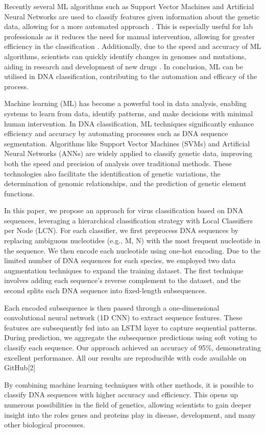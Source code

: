 Recently several ML algorithms such as Support Vector Machines and Artificial Neural Networks are used to classify features given information about the genetic data, allowing for a more automated approach \cite{kalender2020}. This is especially useful for lab professionals as it reduces the need for manual intervention, allowing for greater efficiency in the classification \cite{vihar2019}. Additionally, due to the speed and accuracy of ML algorithms, scientists can quickly identify changes in genomes and mutations, aiding in research and development of new drugs \cite{neto2021}. In conclusion, ML can be utilised in DNA classification, contributing to the automation and efficacy of the process.

Machine learning (ML) has become a powerful tool in data analysis, enabling systems to learn from data, identify patterns, and make decisions with minimal human intervention. In DNA classification, ML techniques significantly enhance efficiency and accuracy by automating processes such as DNA sequence segmentation. Algorithms like Support Vector Machines (SVMs) and Artificial Neural Networks (ANNs) are widely applied to classify genetic data, improving both the speed and precision of analysis over traditional methods. These technologies also facilitate the identification of genetic variations, the determination of genomic relationships, and the prediction of genetic element functions.

In this paper, we propose an approach for virus classification based on DNA sequences, leveraging a hierarchical classification strategy with Local Classifiers per Node (LCN). For each classifier, we first preprocess DNA sequences by replacing ambiguous nucleotides (e.g., M, N) with the most frequent nucleotide in the sequence. We then encode each nucleotide using one-hot encoding. Due to the limited number of DNA sequences for each species, we employed two data augmentation techniques to expand the training dataset. The first technique involves adding each sequence's reverse complement to the dataset, and the second splits each DNA sequence into fixed-length subsequences.

Each encoded subsequence is then passed through a one-dimensional convolutional neural network (1D CNN) to extract sequence features. These features are subsequently fed into an LSTM layer to capture sequential patterns. During prediction, we aggregate the subsequence predictions using soft voting to classify each sequence. Our approach achieved an accuracy of 95\%, demonstrating excellent performance. All our results are reproducible with code available on GitHub[2]


By combining machine learning techniques with other methods, it is possible to classify DNA sequences with higher accuracy and efficiency. This opens up numerous possibilities in the field of genetics, allowing scientists to gain deeper insight into the roles genes and proteins play in disease, development, and many other biological processes.

 


